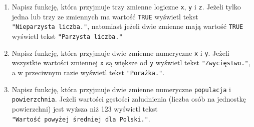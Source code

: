 \documentclass[paper=6in:9in,pagesize=pdftex,headinclude=on,footinclude=on,10pt]{scrbook}
\newenvironment{Shaded}{\begin{snugshade}}{\end{snugshade}}
\newcommand{\CommentTok}[1]{\textcolor[rgb]{0.56,0.35,0.01}{\textit{#1}}}
\newcommand{\DecValTok}[1]{\textcolor[rgb]{0.00,0.00,0.81}{#1}}
\newcommand{\KeywordTok}[1]{\textcolor[rgb]{0.13,0.29,0.53}{\textbf{#1}}}
\newcommand{\NormalTok}[1]{#1}
\newcommand{\OperatorTok}[1]{\textcolor[rgb]{0.81,0.36,0.00}{\textbf{#1}}}
\newcommand{\StringTok}[1]{\textcolor[rgb]{0.31,0.60,0.02}{#1}}
\providecommand{\tightlist}{%
  \setlength{\itemsep}{0pt}\setlength{\parskip}{0pt}}
\begin{document}
\begin{Shaded}
\end{Shaded}

\begin{enumerate}
\def\labelenumi{\arabic{enumi})}
\setcounter{enumi}{2}
\tightlist
\item
  Napisz funkcję, która przyjmuje trzy zmienne logiczne \texttt{x}, \texttt{y} i \texttt{z}.
  Jeżeli tylko jedna lub trzy ze zmiennych ma wartość \texttt{TRUE} wyświetl tekst \texttt{"Nieparzysta\ liczba."}, natomiast jeżeli dwie zmienne mają wartość \texttt{TRUE} wyświetl tekst \texttt{"Parzysta\ liczba."}
\item
  Napisz funkcję, która przyjmuje dwie zmienne numeryczne \texttt{x} i \texttt{y}.
  Jeżeli wszystkie wartości zmiennej \texttt{x} są większe od \texttt{y} wyświetl tekst \texttt{"Zwycięstwo."}, a w przeciwnym razie wyświetl tekst \texttt{"Porażka."}.
\item
  Napisz funkcję, która przyjmuje dwie zmienne numeryczne \texttt{populacja} i \texttt{powierzchnia}.
  Jeżeli wartości gęstości zaludnienia (liczba osób na jednostkę powierzchni) jest wyższa niż 123 wyświetl tekst \texttt{"Wartość\ powyżej\ średniej\ dla\ Polski."}.
\end{enumerate}
\end{document}
